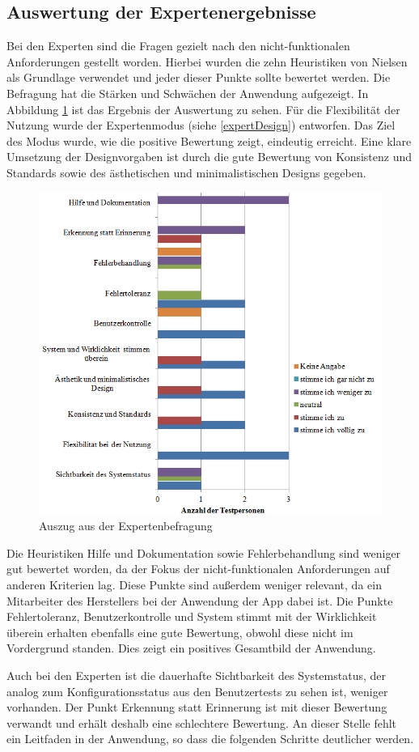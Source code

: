 \subsection{Auswertung der Expertenergebnisse}
Bei den Experten sind die Fragen gezielt nach den nicht-funktionalen Anforderungen gestellt worden. Hierbei wurden die zehn Heuristiken von Nielsen als Grundlage verwendet und jeder dieser Punkte sollte bewertet werden. Die Befragung hat die Stärken und Schwächen der Anwendung aufgezeigt. In Abbildung \ref{bewertungExpert} ist das Ergebnis der Auswertung zu sehen. Für die Flexibilität der Nutzung wurde der Expertenmodus (siehe \ref{expertDesign}) entworfen. Das Ziel des Modus wurde, wie die positive Bewertung zeigt, eindeutig erreicht. Eine klare Umsetzung der Designvorgaben ist durch die gute Bewertung von Konsistenz und Standards sowie des ästhetischen und minimalistischen Designs gegeben. \par 
\begin{figure}
\includegraphics{images/bewertung_expert_complete}
\caption{Auszug aus der Expertenbefragung}
\label{bewertungExpert}
\end{figure}
Die Heuristiken Hilfe und Dokumentation sowie Fehlerbehandlung sind weniger gut bewertet worden, da der Fokus der nicht-funktionalen Anforderungen auf anderen Kriterien lag. Diese Punkte sind außerdem weniger relevant, da ein Mitarbeiter des Herstellers bei der Anwendung der App dabei ist. Die Punkte Fehlertoleranz, Benutzerkontrolle und System stimmt mit der Wirklichkeit überein erhalten ebenfalls eine gute Bewertung, obwohl diese nicht im Vordergrund standen. Dies zeigt ein positives Gesamtbild der Anwendung. \par 
Auch bei den Experten ist die dauerhafte Sichtbarkeit des Systemstatus, der analog zum Konfigurationsstatus aus den Benutzertests zu sehen ist, weniger vorhanden. Der Punkt Erkennung statt Erinnerung ist mit dieser Bewertung verwandt und erhält deshalb eine schlechtere Bewertung.  An dieser Stelle fehlt ein Leitfaden in der Anwendung, so dass die folgenden Schritte deutlicher werden. 

